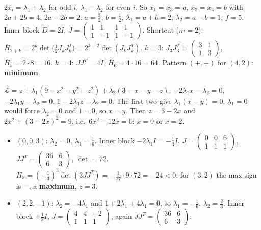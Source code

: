 \begin{solutions}
        $2x_i=\lambda_1+\lambda_2$ for odd $i$, $\lambda_1-\lambda_2$ for even
        $i$. So $x_1=x_3=a$, $x_2=x_4=b$ with $2a+2b=4$, $2a-2b=2$:
        $a=\tfrac32$, $b=\tfrac12$, $\lambda_1=a+b=2$, $\lambda_2=a-b=1$,
        $f=5$. Inner block $D=2I$, $J=\begin{pmatrix}1&1&1&1\\1&-1&1&-1\end{pmatrix}$.
        Shortcut ($m=2$): $\overline{H}_{2+k}=2^{k}\det\bigl(\tfrac12J_kJ_k^{T}\bigr)
        =2^{k-2}\det(J_kJ_k^{T})$. $k=3$: $J_3J_3^{T}=\begin{pmatrix}3&1\\1&3\end{pmatrix}$,
        $\overline{H}_5=2\cdot8=16$. $k=4$: $JJ^{T}=4I$, $\overline{H}_6=4\cdot16=64$.
        Pattern $(+,+)$ for $(4,2)$: \textbf{minimum}.
  \item $\mathcal{L}=z+\lambda_1(9-x^{2}-y^{2}-z^{2})+\lambda_2(3-x-y-z)$:
        $-2\lambda_1x-\lambda_2=0$, $-2\lambda_1y-\lambda_2=0$,
        $1-2\lambda_1z-\lambda_2=0$. The first two give
        $\lambda_1(x-y)=0$; $\lambda_1=0$ would force $\lambda_2=0$ and
        $1=0$, so $x=y$. Then $z=3-2x$ and $2x^{2}+(3-2x)^{2}=9$, i.e.\
        $6x^{2}-12x=0$: $x=0$ or $x=2$.
        \begin{itemize}
          \item $(0,0,3)$: $\lambda_2=0$, $\lambda_1=\tfrac16$. Inner block
                $-2\lambda_1I=-\tfrac13I$, $J=\begin{pmatrix}0&0&6\\1&1&1\end{pmatrix}$,
                $JJ^{T}=\begin{pmatrix}36&6\\6&3\end{pmatrix}$, $\det=72$.
                $\overline{H}_5=(-\tfrac13)^{3}\det(3JJ^{T})=-\tfrac1{27}\cdot9\cdot72=-24<0$:
                for $(3,2)$ the max sign is $-$, a \textbf{maximum}, $z=3$.
          \item $(2,2,-1)$: $\lambda_2=-4\lambda_1$ and $1+2\lambda_1+4\lambda_1=0$,
                so $\lambda_1=-\tfrac16$, $\lambda_2=\tfrac23$. Inner block
                $+\tfrac13I$, $J=\begin{pmatrix}4&4&-2\\1&1&1\end{pmatrix}$,
                again $JJ^{T}=\begin{pmatrix}36&6\\6&3\end{pmatrix}$:

\end{itemize}
\end{solutions}
